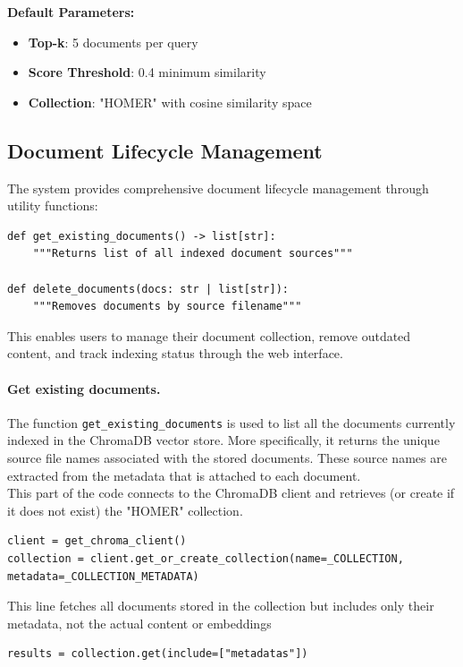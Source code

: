 \documentclass[11pt,a4paper]{report}
\begin{document}
\textbf{Default Parameters:}
\begin{itemize}
    \item \textbf{Top-k}: 5 documents per query
    \item \textbf{Score Threshold}: 0.4 minimum similarity
    \item \textbf{Collection}: "HOMER" with cosine similarity space
\end{itemize}

\subsection{Document Lifecycle Management}

The system provides comprehensive document lifecycle management through utility functions:

\begin{lstlisting}[caption={Document management functions}]
def get_existing_documents() -> list[str]:
    """Returns list of all indexed document sources"""
    
def delete_documents(docs: str | list[str]):
    """Removes documents by source filename"""
\end{lstlisting}

This enables users to manage their document collection, remove outdated content, and track indexing status through the web interface.\\

\paragraph{Get existing documents.}
The function \texttt{get\_existing\_documents} is used to list all the documents currently indexed in the ChromaDB vector store. More specifically, it returns the unique source file names associated with the stored documents. These source names are extracted from the metadata that is attached to each document. \\
This part of the code connects to the ChromaDB client and retrieves (or create if it does not exist) the "HOMER" collection. 
\begin{lstlisting}
client = get_chroma_client()
collection = client.get_or_create_collection(name=_COLLECTION, metadata=_COLLECTION_METADATA)
\end{lstlisting}
This line fetches all documents stored in the collection but includes only their metadata, not the actual content or embeddings
\begin{lstlisting}
results = collection.get(include=["metadatas"])
\end{lstlisting}
\end{document}
